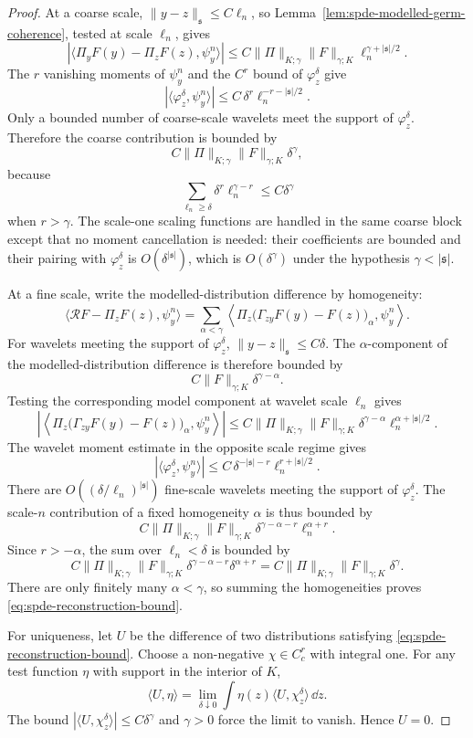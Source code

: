 \begin{proof}
At a coarse scale, \(\|y-z\|_{\mathfrak s}\leq C\ell_n\), so
Lemma~\ref{lem:spde-modelled-germ-coherence}, tested at scale \(\ell_n\),
gives
\[
  |\langle\Pi_yF(y)-\Pi_zF(z),\psi_y^n\rangle|
  \leq
  C\|\Pi\|_{K;\gamma}\|F\|_{\gamma;K}
  \ell_n^{\gamma+|\mathfrak s|/2}.
\]
The \(r\) vanishing moments of \(\psi_y^n\) and the \(C^r\) bound of
\(\varphi_z^\delta\) give
\[
  |\langle\varphi_z^\delta,\psi_y^n\rangle|
  \leq
  C\,\delta^r\ell_n^{-r-|\mathfrak s|/2}.
\]
Only a bounded number of coarse-scale wavelets meet the support of
\(\varphi_z^\delta\).  Therefore the coarse contribution is bounded by
\[
  C\|\Pi\|_{K;\gamma}\|F\|_{\gamma;K}\delta^\gamma ,
\]
because
\[
  \sum_{\ell_n\geq\delta}\delta^r\ell_n^{\gamma-r}
  \leq
  C\delta^\gamma
\]
when \(r>\gamma\).
The scale-one scaling functions are handled in the same coarse block except
that no moment cancellation is needed: their coefficients are bounded and
their pairing with \(\varphi_z^\delta\) is \(O(\delta^{|\mathfrak s|})\),
which is \(O(\delta^\gamma)\) under the hypothesis \(\gamma<|\mathfrak s|\).

At a fine scale, write the modelled-distribution difference by homogeneity:
\[
  \langle\mathcal RF-\Pi_zF(z),\psi_y^n\rangle
  =
  \sum_{\alpha<\gamma}
  \left\langle
    \Pi_z\bigl(\Gamma_{zy}F(y)-F(z)\bigr)_\alpha,\psi_y^n
  \right\rangle .
\]
For wavelets meeting the support of \(\varphi_z^\delta\),
\(\|y-z\|_{\mathfrak s}\leq C\delta\).  The \(\alpha\)-component of the
modelled-distribution difference is therefore bounded by
\[
  C\|F\|_{\gamma;K}\delta^{\gamma-\alpha}.
\]
Testing the corresponding model component at wavelet scale \(\ell_n\) gives
\[
  \left|
  \left\langle
    \Pi_z\bigl(\Gamma_{zy}F(y)-F(z)\bigr)_\alpha,\psi_y^n
  \right\rangle
  \right|
  \leq
  C\|\Pi\|_{K;\gamma}\|F\|_{\gamma;K}
  \delta^{\gamma-\alpha}\ell_n^{\alpha+|\mathfrak s|/2}.
\]
The wavelet moment estimate in the opposite scale regime gives
\[
  |\langle\varphi_z^\delta,\psi_y^n\rangle|
  \leq
  C\,\delta^{-|\mathfrak s|-r}\ell_n^{r+|\mathfrak s|/2}.
\]
There are \(O((\delta/\ell_n)^{|\mathfrak s|})\) fine-scale wavelets meeting
the support of \(\varphi_z^\delta\).  The scale-\(n\) contribution of a fixed
homogeneity \(\alpha\) is thus bounded by
\[
  C\|\Pi\|_{K;\gamma}\|F\|_{\gamma;K}
  \delta^{\gamma-\alpha-r}\ell_n^{\alpha+r}.
\]
Since \(r>-\alpha\), the sum over \(\ell_n<\delta\) is bounded by
\[
  C\|\Pi\|_{K;\gamma}\|F\|_{\gamma;K}
  \delta^{\gamma-\alpha-r}\delta^{\alpha+r}
  =
  C\|\Pi\|_{K;\gamma}\|F\|_{\gamma;K}\delta^\gamma .
\]
There are only finitely many \(\alpha<\gamma\), so summing the homogeneities
proves \eqref{eq:spde-reconstruction-bound}.

For uniqueness, let \(U\) be the difference of two distributions satisfying
\eqref{eq:spde-reconstruction-bound}.  Choose a non-negative
\(\chi\in C_c^r\) with integral one.  For any test function \(\eta\) with
support in the interior of \(K\),
\[
  \langle U,\eta\rangle
  =
  \lim_{\delta\downarrow0}
  \int \eta(z)\langle U,\chi_z^\delta\rangle\,\dd z .
\]
The bound \(|\langle U,\chi_z^\delta\rangle|\leq C\delta^\gamma\) and
\(\gamma>0\) force the limit to vanish.  Hence \(U=0\).
\end{proof}


